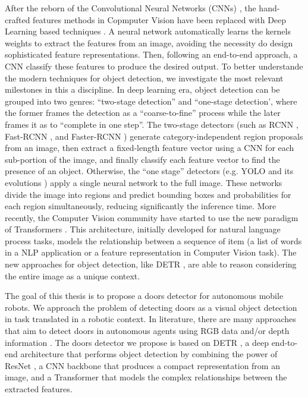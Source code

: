 After the reborn of the Convolutional Neural Networks (CNNs) \cite{imagenetclassification}, the hand-crafted features methods in Copmputer Vision have been replaced with Deep Learning based techniques \cite{deeplearningoverview}. A neural network automatically learns the kernels weights to extract the features from an image, avoiding the necessity do design sophisticated feature representations. Then, following an end-to-end approach, a CNN classify these features to produce the desired output. To better understande the modern techniques for object detection, we investigate the most relevant milestones in this a discipline. In deep learning era, object detection can be grouped
into two genres: ``two-stage detection'' and ``one-stage detection', where the former frames the detection as a ``coarse-to-fine'' process while the later frames it as to ``complete in one step''. The two-stage detectors (such as RCNN \cite{rcnn}, Fast-RCNN \cite{fastrcnn}, and Faster-RCNN \cite{fasterrcnn})  generate category-independent region proposals from an image, then extract a fixed-length feature vector using a CNN for each sub-portion of the image, and finally classify each feature vector to find the presence of an object. Otherwise, the ``one stage'' detectors (e.g. YOLO \cite{yolo} and its evolutions \cite{yolov2, yolov3}) apply a single neural network to the
full image. These networks divide the image into regions
and predict bounding boxes and probabilities for each
region simultaneously, reducing significantly the inference time. More recently, the Computer Vision community have started to use the new paradigm of Transformers \cite{transformer}. This architecture, initially developed for natural language process tasks, models the relationship between a sequence of item (a list of words in a NLP application or a feature representation in Computer Vision task). The new approaches for object detection, like DETR \cite{detr}, are able to reason considering the entire image as a unique context.

The goal of this thesis is to propose a doors detector for autonomous mobile robots. We approach the problem of detecting doors as a visual object detection in task translated in a robotic context. In literature, there are many approaches that aim to detect doors in autonomous agents using RGB data \cite{doorsandnavigation, detectdoorsfeature} and/or depth information \cite{doorcabinet}. The doors detector we propose is based on DETR \cite{detr}, a deep end-to-end architecture that performs object detection by combining the power of ResNet \cite{resnet}, a CNN backbone that produces a compact representation from an image, and a Transformer \cite{transformer} that models the complex relationships between the extracted features.


